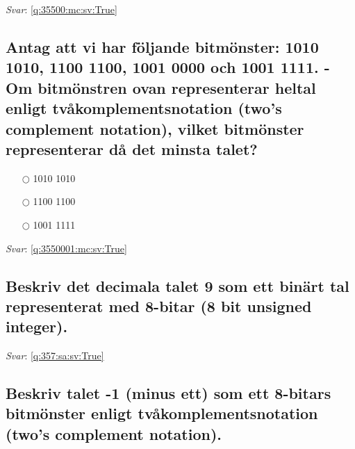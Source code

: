 \documentclass[a4paper,11pt,oneside]{article}
\begin{document}
\begin{sloppypar}
\vspace{1cm}

\textit{Svar}: \autoref{q:35500:mc:sv:True}

\subsection{Antag att vi har f\"oljande bitm\"onster: 1010 1010, 1100 1100, 1001 0000 och 1001 1111. - Om bitm\"onstren ovan representerar heltal enligt tv\r{a}komplementsnotation (two{\textquoteright}s complement notation), vilket bitm\"onster representerar d\r{a} det minsta talet?}

\label{q:3550001:mc:sv:False}

\begin{itemize}
  \item[$\bigcirc$] 1010 1010
  \item[$\bigcirc$] 1100 1100
  \item[$\bigcirc$] 1001 1111
\end{itemize}

\vspace{1cm}

\textit{Svar}: \autoref{q:3550001:mc:sv:True}





\subsection{Beskriv det decimala talet 9 som ett bin\"art tal representerat med 8-bitar (8 bit unsigned integer).}

\label{q:357:sa:sv:False}

\vspace{2cm}

\noindent\makebox[\textwidth]{\hrulefill}

\vspace{1cm}

\textit{Svar}: \autoref{q:357:sa:sv:True}



\subsection{Beskriv talet -1 (minus ett) som ett 8-bitars bitm\"onster enligt tv\r{a}komplementsnotation (two{\textquoteright}s complement notation).}

\label{q:358:sa:sv:False}

\vspace{2cm}


\end{sloppypar}
\end{document}
